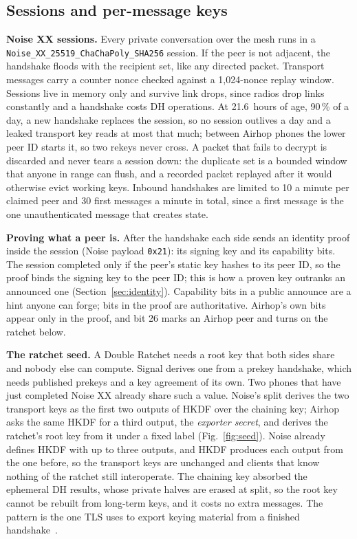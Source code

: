 \documentclass[conference]{IEEEtran}
\newcommand{\code}[1]{\texttt{#1}}
\newcommand{\hx}[1]{\texttt{0x#1}}
\begin{document}
\subsection{Sessions and per-message keys}
\label{sec:sessions}

\textbf{Noise XX sessions.} Every private conversation over the mesh runs in a \code{Noise\_XX\_25519\_ChaChaPoly\_SHA256} session. If the peer is not adjacent, the handshake floods with the recipient set, like any directed packet. Transport messages carry a counter nonce checked against a 1,024-nonce replay window. Sessions live in memory only and survive link drops, since radios drop links constantly and a handshake costs DH operations. At 21.6~hours of age, 90\,\% of a day, a new handshake replaces the session, so no session outlives a day and a leaked transport key reads at most that much; between Airhop phones the lower peer ID starts it, so two rekeys never cross. A packet that fails to decrypt is discarded and never tears a session down: the duplicate set is a bounded window that anyone in range can flush, and a recorded packet replayed after it would otherwise evict working keys. Inbound handshakes are limited to 10 a minute per claimed peer and 30 first messages a minute in total, since a first message is the one unauthenticated message that creates state.

\textbf{Proving what a peer is.} After the handshake each side sends an identity proof inside the session (Noise payload \hx{21}): its signing key and its capability bits. The session completed only if the peer's static key hashes to its peer ID, so the proof binds the signing key to the peer ID; this is how a proven key outranks an announced one (Section~\ref{sec:identity}). Capability bits in a public announce are a hint anyone can forge; bits in the proof are authoritative. Airhop's own bits appear only in the proof, and bit 26 marks an Airhop peer and turns on the ratchet below.

\textbf{The ratchet seed.} A Double Ratchet needs a root key that both sides share and nobody else can compute. Signal derives one from a prekey handshake, which needs published prekeys and a key agreement of its own. Two phones that have just completed Noise XX already share such a value. Noise's split derives the two transport keys as the first two outputs of HKDF over the chaining key; Airhop asks the same HKDF for a third output, the \emph{exporter secret}, and derives the ratchet's root key from it under a fixed label (Fig.~\ref{fig:seed}). Noise already defines HKDF with up to three outputs, and HKDF produces each output from the one before, so the transport keys are unchanged and clients that know nothing of the ratchet still interoperate. The chaining key absorbed the ephemeral DH results, whose private halves are erased at split, so the root key cannot be rebuilt from long-term keys, and it costs no extra messages. The pattern is the one TLS uses to export keying material from a finished handshake~\cite{rfc5705,rfc8446}.
\end{document}
